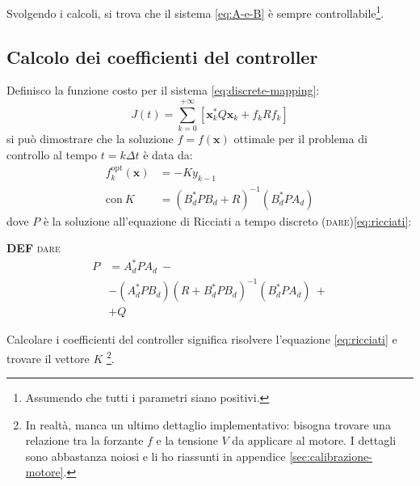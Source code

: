 Svolgendo i calcoli, si trova che il sistema \eqref{eq:A-e-B} è sempre controllabile\footnote{Assumendo che tutti i
parametri siano positivi.}.

\subsection{Calcolo dei coefficienti del controller}\label{calcolo-coefficienti}
Definisco la funzione costo per il sistema \eqref{eq:discrete-mapping}:
\begin{equation}
  J(t) =
  \sum_{k=0}^{+\infty} \left[ \mathbf{x}_k^* Q \mathbf {x}_k + f_k R f_k \right]
  \label{eq:lqr-costo-discreto}
\end{equation}
si può dimostrare\cite{chow1975analysis} che la soluzione $f = f(\mathbf x)$ ottimale per il problema di controllo al tempo $t = k \Delta t$ è data da:
\begin{equation}
  \begin{aligned}
  f_k^{\text{opt}}(\mathbf x) &= -K y_{k-1} \\
  \text{con}\ K &= (B_d^*PB_d + R)^{-1}(B_d^*PA_d)
  \end{aligned}
  \label{eq:f-opt}
\end{equation}
dove $P$ è la soluzione all'equazione di Ricciati a tempo discreto (\textsc{dare})\eqref{eq:ricciati}:%
\begin{framed}
  \textbf{DEF} \textsc{dare}
  \begin{equation}
    \begin{aligned}
    P &=A_d^* P A_d\ - \\
     &-(A_d^* P B_d)(R + B_d^* P B_d)^{-1}(B_d^* P A_d)\ + \\
    &+ Q
    \end{aligned}
    \label{eq:ricciati}
  \end{equation}%
\end{framed}%
Calcolare i coefficienti del controller significa risolvere l'equazione \eqref{eq:ricciati} e trovare il vettore $K$
\footnote{In realtà, manca un ultimo dettaglio implementativo: bisogna trovare una relazione tra la forzante $f$ e
la tensione $V$ da applicare al motore. I dettagli sono abbastanza noiosi e li ho riassunti in appendice \ref{sec:calibrazione-motore}.}.


